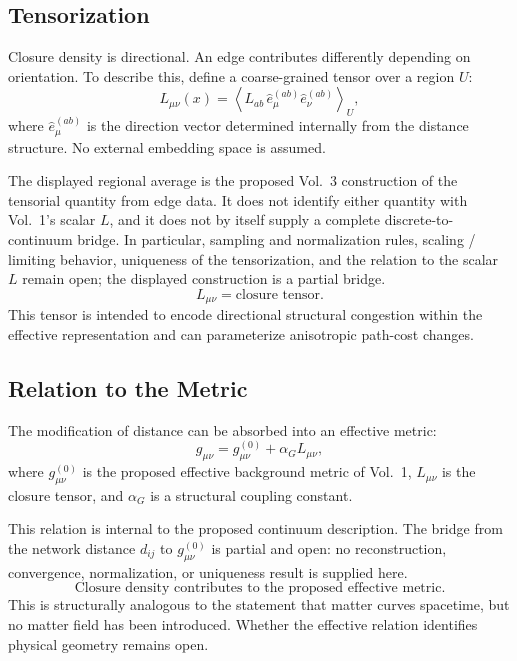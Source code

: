 \subsection{Tensorization}

Closure density is directional.
An edge contributes differently depending on orientation.
To describe this, define a coarse-grained tensor over a region $U$:
\begin{equation}
  L_{\mu\nu}(x)
  = \left\langle L_{ab}\,\hat{e}^{(ab)}_\mu \hat{e}^{(ab)}_\nu \right\rangle_U,
\end{equation}
where $\hat{e}^{(ab)}_\mu$ is the direction vector determined internally
from the distance structure. No external embedding space is assumed.

The displayed regional average is the proposed Vol.~3 construction of the
tensorial quantity from edge data. It does not identify either quantity with
Vol.~1's scalar $L$, and it does not by itself supply a complete
discrete-to-continuum bridge. In particular, sampling and normalization rules,
scaling / limiting behavior, uniqueness of the tensorization, and the relation
to the scalar $L$ remain open; the displayed construction is a partial bridge.
\begin{equation}
  \boxed{L_{\mu\nu} = \text{closure tensor.}}
\end{equation}
This tensor is intended to encode directional structural congestion within the
effective representation and can parameterize anisotropic path-cost changes.

\subsection{Relation to the Metric}

The modification of distance can be absorbed into an effective metric:
\begin{equation}
  \label{eq:metric_closure}
  g_{\mu\nu} = g^{(0)}_{\mu\nu} + \alpha_G L_{\mu\nu},
\end{equation}
where $g^{(0)}_{\mu\nu}$ is the proposed effective background metric of Vol.~1,
$L_{\mu\nu}$ is the closure tensor,
and $\alpha_G$ is a structural coupling constant.

This relation is internal to the proposed continuum description. The bridge
from the network distance $d_{ij}$ to $g^{(0)}_{\mu\nu}$ is partial and open:
no reconstruction, convergence, normalization, or uniqueness result is
supplied here.
\begin{equation}
  \boxed{\text{Closure density contributes to the proposed effective metric.}}
\end{equation}
This is structurally analogous to the statement that matter curves spacetime,
but no matter field has been introduced.
Whether the effective relation identifies physical geometry remains open.

